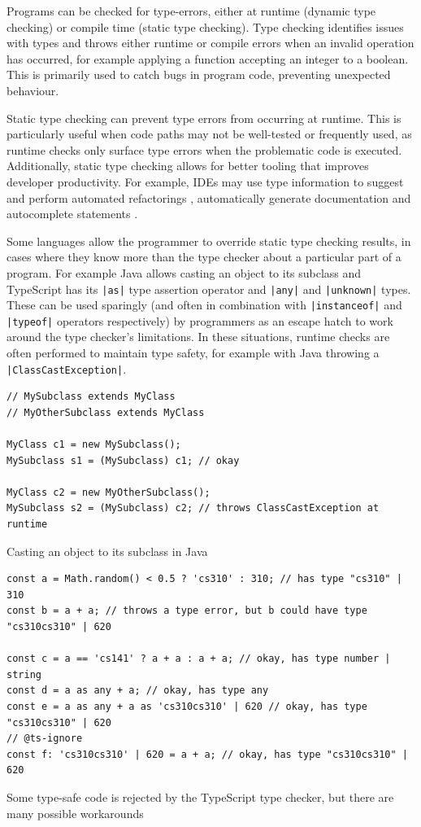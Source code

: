 \documentclass[a4paper,fleqn,12pt]{article}
\begin{document}
Programs can be checked for type-errors, either at runtime (dynamic type checking) or compile time (static type checking). Type checking identifies issues with types and throws either runtime or compile errors when an invalid operation has occurred, for example applying a function accepting an integer to a boolean. This is primarily used to catch bugs in program code, preventing unexpected behaviour.

Static type checking can prevent type errors from occurring at runtime. This is particularly useful when code paths may not be well-tested or frequently used, as runtime checks only surface type errors when the problematic code is executed. Additionally, static type checking allows for better tooling that improves developer productivity. For example, IDEs may use type information to suggest and perform automated refactorings \citep{ref1}, automatically generate documentation \citep{ref2} and autocomplete statements \citep{ref3}.

Some languages allow the programmer to override static type checking results, in cases where they know more than the type checker about a particular part of a program. For example Java allows casting an object to its subclass and TypeScript has its \texttt{|as|} type assertion operator and \texttt{|any|} and \texttt{|unknown|} types. These can be used sparingly (and often in combination with \texttt{|instanceof|} and \texttt{|typeof|} operators respectively) by programmers as an escape hatch to work around the type checker’s limitations. In these situations, runtime checks are often performed to maintain type safety, for example with Java throwing a \texttt{|ClassCastException|}.

\begin{verbatim}
// MySubclass extends MyClass
// MyOtherSubclass extends MyClass

MyClass c1 = new MySubclass();
MySubclass s1 = (MySubclass) c1; // okay

MyClass c2 = new MyOtherSubclass();
MySubclass s2 = (MySubclass) c2; // throws ClassCastException at runtime
\end{verbatim}
Casting an object to its subclass in Java

\begin{verbatim}
const a = Math.random() < 0.5 ? 'cs310' : 310; // has type "cs310" | 310
const b = a + a; // throws a type error, but b could have type "cs310cs310" | 620

const c = a == 'cs141' ? a + a : a + a; // okay, has type number | string
const d = a as any + a; // okay, has type any
const e = a as any + a as 'cs310cs310' | 620 // okay, has type "cs310cs310" | 620
// @ts-ignore
const f: 'cs310cs310' | 620 = a + a; // okay, has type "cs310cs310" | 620
\end{verbatim}
Some type-safe code is rejected by the TypeScript type checker, but there are many possible workarounds
\end{document}
